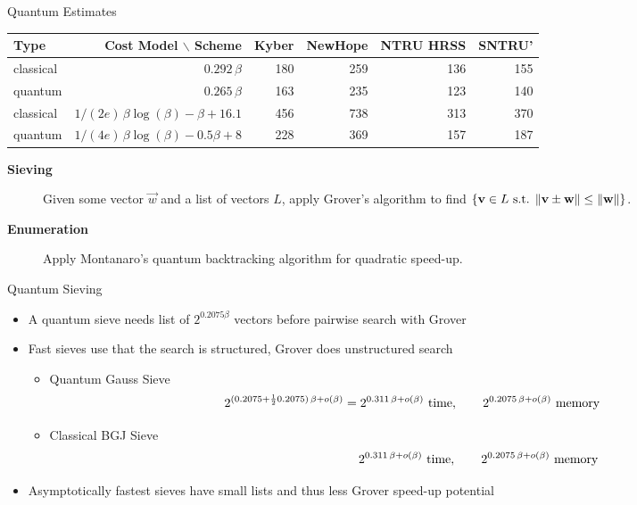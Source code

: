\documentclass[xcolor=table,10pt,aspectratio=169]{beamer}
\def\enumworstfit{\(1/(2e)\, \beta \log(\beta) - \beta + 16.1\)}
\def\qenumworstfit{\(1/(4e)\, \beta \log(\beta) - 0.5\beta + 8\)}
\def\robl{\rowcolor{DarkBlue!20}}
\def\rore{\rowcolor{DarkRed!20}}
\begin{document}
\begin{frame}[label={sec:orgc816741}]{Quantum Estimates}
\begin{center}
\small{
\begin{center}
\begin{tabular}{lrrrrr}
\textbf{Type} & \textbf{Cost Model} $\backslash$ \textbf{Scheme} & \textbf{Kyber} & \textbf{NewHope} & \textbf{NTRU HRSS} & \textbf{SNTRU'}\\
\hline
\rore classical & \(0.292\,β\) & 180 & 259 & 136 & 155\\
\rore quantum & \(0.265\,\beta\) & 163 & 235 & 123 & 140\\
\hline
\robl classical & \enumworstfit & 456 & 738 & 313 & 370\\
\robl quantum & \qenumworstfit & 228 & 369 & 157 & 187\\
\end{tabular}

\end{center}
}
\end{center}


\begin{description}
\item[{{\color{LightRed} \textbf{Sieving} }}] Given some vector \(\vec{w}\) and a list of vectors \(L\), apply Grover’s algorithm to find \(\{\vec{v} \in L \textnormal{ s.t. } \|\vec{v} \pm \vec{w}\| \leq \|\vec{w}\|\}\).

\item[{{\color{DarkBlue} \textbf{Enumeration} }}] Apply Montanaro’s quantum backtracking algorithm for quadratic speed-up.
\end{description}
\end{frame}

\begin{frame}[label={sec:orgb306cdc}]{Quantum Sieving}
\begin{itemize}
\item A quantum sieve needs list of \(2^{0.2075 \beta}\) vectors before pairwise search with Grover

\item Fast sieves use that the search is structured, Grover does unstructured search
\begin{itemize}
\item Quantum Gauss Sieve \[2^{(0.2075 + \frac{1}{2} 0.2075)\, \beta + o(\beta)} = 2^{0.311\, \beta + o(\beta)} \textnormal{ time},\qquad 2^{0.2075\, \beta + o(\beta)} \textnormal{ memory}\]
\item Classical BGJ Sieve  \[\phantom{2^{(0.2075 + \frac{1}{2} 0.2075)\, \beta + o(\beta)} = }2^{0.311\, \beta + o(\beta)}\textnormal{ time}, \qquad 2^{0.2075\, \beta + o(\beta)} \textnormal{ memory}\]
\end{itemize}
\item Asymptotically fastest sieves have small lists and thus less Grover speed-up potential
\end{itemize}
\end{frame}
\end{document}

